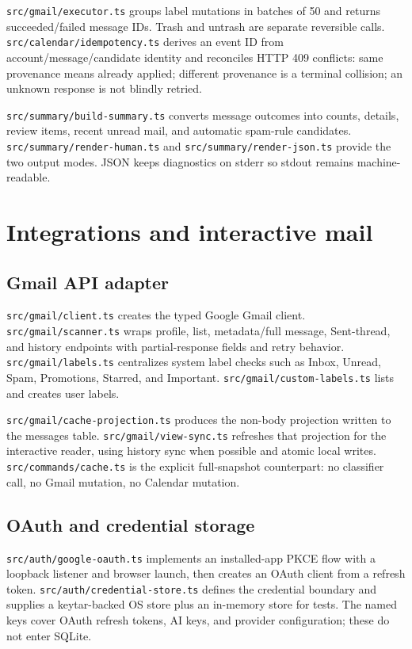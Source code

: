 \documentclass[12pt,oneside]{book}
\newcommand{\file}[1]{\nolinkurl{#1}}
\begin{document}
\file{src/gmail/executor.ts} groups label mutations in batches of 50 and returns succeeded/failed message IDs. Trash and untrash are separate reversible calls. \file{src/calendar/idempotency.ts} derives an event ID from account/message/candidate identity and reconciles HTTP 409 conflicts: same provenance means already applied; different provenance is a terminal collision; an unknown response is not blindly retried.

\file{src/summary/build-summary.ts} converts message outcomes into counts, details, review items, recent unread mail, and automatic spam-rule candidates. \file{src/summary/render-human.ts} and \file{src/summary/render-json.ts} provide the two output modes. JSON keeps diagnostics on stderr so stdout remains machine-readable.

\chapter{Integrations and interactive mail}

\section{Gmail API adapter}

\file{src/gmail/client.ts} creates the typed Google Gmail client. \file{src/gmail/scanner.ts} wraps profile, list, metadata/full message, Sent-thread, and history endpoints with partial-response fields and retry behavior. \file{src/gmail/labels.ts} centralizes system label checks such as Inbox, Unread, Spam, Promotions, Starred, and Important. \file{src/gmail/custom-labels.ts} lists and creates user labels.

\file{src/gmail/cache-projection.ts} produces the non-body projection written to the messages table. \file{src/gmail/view-sync.ts} refreshes that projection for the interactive reader, using history sync when possible and atomic local writes. \file{src/commands/cache.ts} is the explicit full-snapshot counterpart: no classifier call, no Gmail mutation, no Calendar mutation.

\section{OAuth and credential storage}

\file{src/auth/google-oauth.ts} implements an installed-app PKCE flow with a loopback listener and browser launch, then creates an OAuth client from a refresh token. \file{src/auth/credential-store.ts} defines the credential boundary and supplies a keytar-backed OS store plus an in-memory store for tests. The named keys cover OAuth refresh tokens, AI keys, and provider configuration; these do not enter SQLite.
\end{document}
